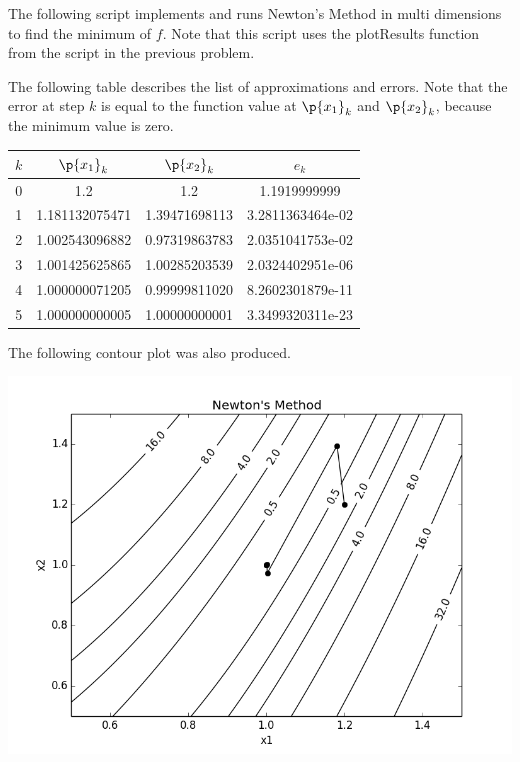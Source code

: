\documentclass[11pt, oneside]{article}
\begin{document}
\begin{enumerate}
    The following script implements and runs Newton's Method in multi dimensions
    to find the minimum of $f$.
    Note that this script uses the plotResults function from the script in the
    previous problem.
    
    The following table describes the list of approximations and errors.
    Note that the error at step $k$ is equal to the function value at
    $\p{x_1}_k$ and $\p{x_2}_k$, because the minimum value is zero.
    \begin{center}
      \begin{tabular}{cccc}
        \toprule
        $k$ & $\p{x_1}_k$ & $\p{x_2}_k$ & $e_k$ \\
        \midrule
        0 & 1.2            & 1.2           & 1.1919999999 \\
        1 & 1.181132075471 & 1.39471698113 & 3.2811363464e-02 \\
        2 & 1.002543096882 & 0.97319863783 & 2.0351041753e-02 \\
        3 & 1.001425625865 & 1.00285203539 & 2.0324402951e-06 \\
        4 & 1.000000071205 & 0.99999811020 & 8.2602301879e-11 \\
        5 & 1.000000000005 & 1.00000000001 & 3.3499320311e-23 \\
        \bottomrule
      \end{tabular}
    \end{center}
    The following contour plot was also produced.
    \begin{center}
      \includegraphics[scale=.5]{Figures/02_2}
    \end{center}

\end{enumerate}
\end{document}
